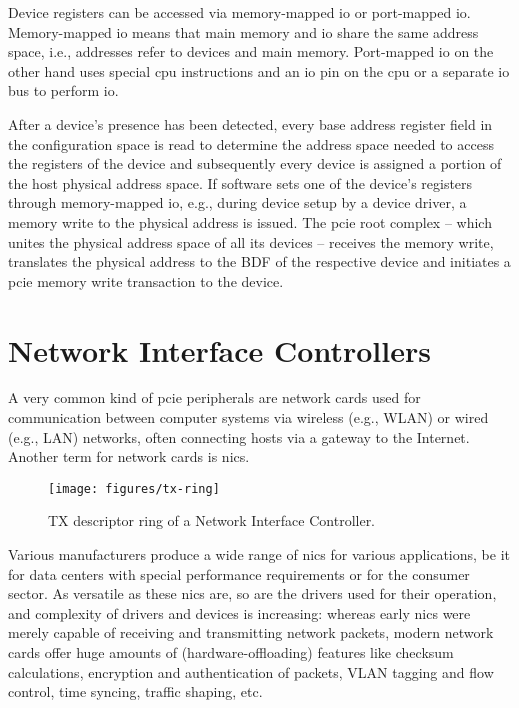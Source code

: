Device registers can be accessed via memory-mapped \ac{io} or port-mapped
\ac{io}. Memory-mapped \ac{io} means that main memory and \ac{io} share the same
address space, i.e., addresses refer to devices and main memory. Port-mapped
\ac{io} on the other hand uses special \ac{cpu} instructions and an \ac{io} pin
on the \ac{cpu} or a separate \ac{io} bus to perform \ac{io}.

After a device's presence has been detected, every base address register field
in the configuration space is read to determine the address space needed to
access the registers of the device and subsequently every device is assigned a
portion of the host physical address space. If software sets one of the device's
registers through memory-mapped \ac{io}, e.g., during device setup by a device
driver, a memory write to the physical address is issued. The \ac{pcie} root
complex -- which unites the physical address space of all its devices --
receives the memory write, translates the physical address to the BDF of the
respective device and initiates a \ac{pcie} memory write transaction to the
device.


\section{Network Interface Controllers}

A very common kind of \ac{pcie} peripherals are network cards used for
communication between computer systems via wireless (e.g., WLAN) or wired (e.g.,
LAN) networks, often connecting hosts via a gateway to the Internet. Another
term for network cards is \acfp{nic}.

\begin{figure}[!b]
    \centering
    \texttt{[image: figures/tx-ring]}
    \caption{TX descriptor ring of a Network Interface Controller.}
    \label{fig:tx-ring}
\end{figure}

Various manufacturers produce a wide range of \acp{nic} for various
applications, be it for data centers with special performance requirements or
for the consumer sector. As versatile as these \acp{nic} are, so are the drivers
used for their operation, and complexity of drivers and devices is increasing:
whereas early \acp{nic} were merely capable of receiving and transmitting
network packets, modern network cards offer huge amounts of
(hardware-offloading) features like checksum calculations, encryption and
authentication of packets, VLAN tagging and flow control, time syncing, traffic
shaping, etc.

